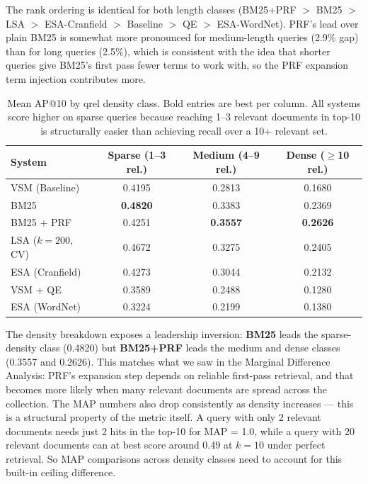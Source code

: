 \documentclass{article}
\begin{document}
The rank ordering is identical for both length classes (BM25+PRF $>$ BM25 $>$ LSA $>$ ESA-Cranfield $>$ Baseline $>$ QE $>$ ESA-WordNet). PRF's lead over plain BM25 is somewhat more pronounced for medium-length queries (2.9\% gap) than for long queries (2.5\%), which is consistent with the idea that shorter queries give BM25's first pass fewer terms to work with, so the PRF expansion term injection contributes more.

\begin{table}[H]
\centering
\renewcommand{\arraystretch}{1.2}
\begin{tabular}{lccc}
\toprule
\textbf{System} & \textbf{Sparse (1--3 rel.)} & \textbf{Medium (4--9 rel.)} & \textbf{Dense ($\ge$10 rel.)} \\
\midrule
VSM (Baseline)      & 0.4195 & 0.2813 & 0.1680 \\
BM25                & \textbf{0.4820} & 0.3383 & 0.2369 \\
BM25 + PRF          & 0.4251 & \textbf{0.3557} & \textbf{0.2626} \\
LSA ($k{=}200$, CV) & 0.4672 & 0.3275 & 0.2405 \\
ESA (Cranfield)     & 0.4273 & 0.3044 & 0.2132 \\
VSM + QE            & 0.3589 & 0.2488 & 0.1280 \\
ESA (WordNet)       & 0.3224 & 0.2199 & 0.1380 \\
\bottomrule
\end{tabular}
\caption{Mean AP@10 by qrel density class. Bold entries are best per column. All systems score higher on sparse queries because reaching 1--3 relevant documents in top-10 is structurally easier than achieving recall over a 10+ relevant set.}
\label{tab:densityclass}
\end{table}

The density breakdown exposes a leadership inversion: \textbf{BM25} leads the sparse-density class (0.4820) but \textbf{BM25+PRF} leads the medium and dense classes (0.3557 and 0.2626). This matches what we saw in the Marginal Difference Analysis: PRF's expansion step depends on reliable first-pass retrieval, and that becomes more likely when many relevant documents are spread across the collection. The MAP numbers also drop consistently as density increases --- this is a structural property of the metric itself. A query with only 2 relevant documents needs just 2 hits in the top-10 for MAP = 1.0, while a query with 20 relevant documents can at best score around 0.49 at $k{=}10$ under perfect retrieval. So MAP comparisons across density classes need to account for this built-in ceiling difference.
\end{document}
